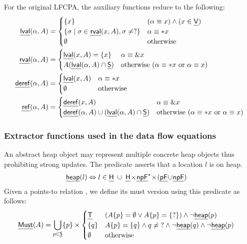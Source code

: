 \documentclass[a4paper,11pt,fleqn]{article}
\newcommand{\var}{\text{\sf\em V\/}\xspace}
\newcommand{\must}{\text{\sf\em Must\/}\xspace}
\begin{document}
For the original LFCPA, the auxiliary functions reduce to the following:
\begin{align}
\lval(\alpha,A) & =  
		\begin{cases}
		\{ x \} 	
				& (\alpha \equiv x) \wedge (x \in \var)
			\\
		\left\{ \sigma \mid \sigma \in \rval(x,A), \sigma \neq ? \right\}
				& \alpha \equiv *x
			\\
		\emptyset	& \text{otherwise}
		\end{cases}
		\\
\rval(\alpha, A) & = 
		\begin{cases}
		\lval(x,A) = \{ x \}
			& \alpha \equiv \&x
			\\
		A(\lval(\alpha,A) \cap \source) 
			& \text{otherwise ($\alpha\equiv *x$ or $\alpha\equiv x$)}
		\end{cases}
		\\
\derefp(\alpha,A) & =  
		\begin{cases}
		\lval(x,A) 
				& \alpha \equiv *x 
			\\
		\emptyset	& \text{otherwise}
		\end{cases}
		\\
\refp(\alpha,A) & =  
		\begin{cases}
		\derefp(x,A) 
			& \alpha \equiv \&x
			\\
		\derefp(\alpha,A) \cup \left(\lval(\alpha,A) \cap \source\right)
			&	\text{otherwise ($\alpha\equiv *x$ or $\alpha\equiv x$)}
		\end{cases}
\end{align}


\newcommand{\ma}{\text{\em mA\/}\xspace}

\subsubsection*{Extractor functions used in the data flow equations}
An abstract heap object may represent multiple concrete heap objects thus
prohibiting strong updates. The predicate  asserts
that a location $l$ is on heap.  
\begin{align}
\text{{\sf\em heap}}(l) &
	\Leftrightarrow 
	   l \in \text{\sf\em H\/} 
		\; \cup \; \text{\sf\em H\/}\! \times\! \text{\sf\em npF\/}^{*} \!\times\! (\text{\sf\em pF\/}\! \cup\! \text{\sf\em npF\/})
\end{align}
Given a points-to relation ,
we define its must version using this predicate as follows:
\begin{align}
  \must(A) & 
	= \bigcup_{p\in \source} \{p\} \times
	\begin{cases}
     \target & \left(A\{p\} = \emptyset \vee A\{p\} = \{?\}\right)    \wedge \neg\hloc(p)      \\
     \{q\} & A\{p\} = \{ q \} \wedge q \neq \mbox{?} \wedge \neg\hloc(q)   \wedge \neg\hloc(p)                \\
     \emptyset & \mbox{otherwise}
  \end{cases}
	\label{eq:must.heap.def}
\end{align}
\end{document}
